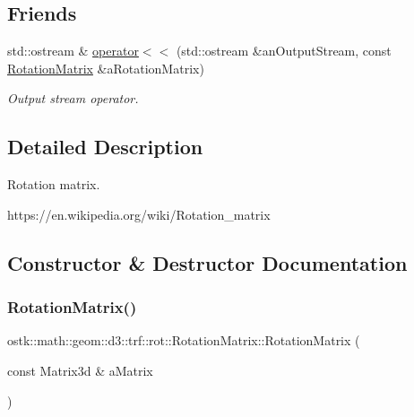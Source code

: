 \subsection*{Friends}
\begin{DoxyCompactItemize}
\item 
std\+::ostream \& \hyperlink{classostk_1_1math_1_1geom_1_1d3_1_1trf_1_1rot_1_1_rotation_matrix_aa9ed0897a6219331deeb7750017a0df9}{operator$<$$<$} (std\+::ostream \&an\+Output\+Stream, const \hyperlink{classostk_1_1math_1_1geom_1_1d3_1_1trf_1_1rot_1_1_rotation_matrix}{Rotation\+Matrix} \&a\+Rotation\+Matrix)
\begin{DoxyCompactList}\small\item\em Output stream operator. \end{DoxyCompactList}\end{DoxyCompactItemize}


\subsection{Detailed Description}
Rotation matrix. 

https\+://en.wikipedia.\+org/wiki/\+Rotation\+\_\+matrix 

\subsection{Constructor \& Destructor Documentation}
\mbox{\label{classostk_1_1math_1_1geom_1_1d3_1_1trf_1_1rot_1_1_rotation_matrix_a5e6bed0779ad7db0c5bf26b2bd96f8ba}} 
\subsubsection{\texorpdfstring{Rotation\+Matrix()}{RotationMatrix()}\hspace{0.1cm}{\footnotesize\ttfamily [1/2]}}
{\footnotesize\ttfamily ostk\+::math\+::geom\+::d3\+::trf\+::rot\+::\+Rotation\+Matrix\+::\+Rotation\+Matrix (\begin{DoxyParamCaption}\item[{const Matrix3d \&}]{a\+Matrix }\end{DoxyParamCaption})}



